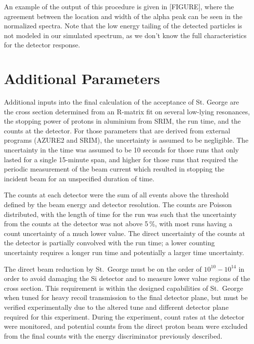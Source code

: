 An example of the output of this procedure is given in {[}FIGURE{]},
where the agreement between the location and width of the alpha peak can
be seen in the normalized spectra. Note that the low energy tailing of
the detected particles is not modeled in our simulated spectrum, as we
don't know the full characteristics for the detector response.


\section{Additional Parameters}
\label{sec:additional-parameters}

Additional inputs into the final calculation of the acceptance of St.
George are the cross section determined from an R-matrix fit on several
low-lying resonances, the stopping power of protons in aluminium from
SRIM, the run time, and the counts at the detector. For those parameters
that are derived from external programs (AZURE2 and SRIM), the
uncertainty is assumed to be negligible. The uncertainty in the time was
assumed to be 10 seconds for those runs that only lasted for a single
15-minute span, and higher for those runs that required the periodic
measurement of the beam current which resulted in stopping the incident
beam for an unspecified duration of time.

The counts at each detector were the sum of all events above the
threshold defined by the beam energy and detector resolution. The counts
are Poisson distributed, with the length of time for the run was such
that the uncertainty from the counts at the detector was not above 5\,\%,
with most runs having a count uncertainty of a much lower value. The
direct uncertainty of the counts at the detector is partially convolved
with the run time; a lower counting uncertainty requires a longer run
time and potentially a larger time uncertainty.

The direct beam reduction by St.\ George must be on the order of
$10^{10}-10^{14}$ in order to avoid damaging the Si detector and to
measure lower value regions of the cross section. This requirement is
within the designed capabilities of St.\ George when tuned for heavy
recoil transmission to the final detector plane, but must be verified
experimentally due to the altered tune and different detector plane
required for this experiment. During the experiment, count rates at the
detector were monitored, and potential counts from the direct proton
beam were excluded from the final counts with the energy discriminator
previously described.

